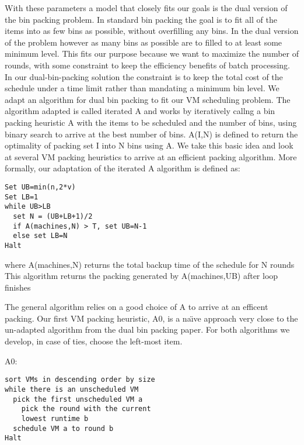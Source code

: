 With these parameters a model that closely fits our goals is the dual version
of the
bin packing problem. In standard bin packing the goal is to fit all of the
items into as few bins as possible, without overfilling any bins. In the dual
version of the problem however as many bins as possible are to filled to at
least some minimum level. This fits our purpose because we want to maximize the
number of rounds, with some constraint to keep the efficiency benefits of batch
processing. In our dual-bin-packing solution the constraint is to keep the total
cost of the schedule under a time limit rather than mandating a minimum bin
level. We
adapt an algorithm for dual bin packing\cite{DualBinPacking} to fit our VM
scheduling problem. The algorithm adapted is called iterated A and works by
iteratively callng a bin packing heuristic A with the items to be scheduled and
the number of bins, using binary search to arrive at the best number of
bins. A(I,N) is defined to return the optimality of packing set I into N bins
using A. We take this basic idea and look at several VM packing heuristics to
arrive at an efficient packing algorithm. More formally, our adaptation of the
iterated A algorithm is defined as:


\begin{lstlisting}
Set UB=min(n,2*v)
Set LB=1
while UB>LB
  set N = (UB+LB+1)/2
  if A(machines,N) > T, set UB=N-1
  else set LB=N
Halt
\end{lstlisting}
where A(machines,N) returns the total backup time of the schedule for N rounds\\
This algorithm returns the packing generated by A(machines,UB) after loop finishes

The general algorithm relies on a good choice of A to arrive at an efficent
packing. Our first VM packing heuristic, A0, is a na\"\i{}ve approach very
close to the un-adapted algorithm from the dual bin packing paper. For both
algorithms we develop, in case of ties, choose the left-most item.

A0:
\begin{lstlisting}
sort VMs in descending order by size
while there is an unscheduled VM
  pick the first unscheduled VM a
    pick the round with the current
    lowest runtime b
  schedule VM a to round b
Halt
\end{lstlisting}

